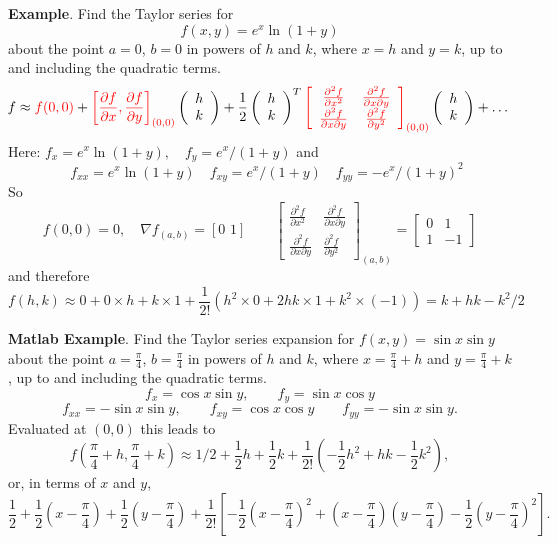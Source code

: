 \documentclass{article}
\begin{document}
\textbf{Example}.  Find the Taylor series  for
$$
f(x,y) = e^x \ln(1+y)
$$
about the point $a=0$, $b=0$ in powers of $h$ and $k$, where $x=h$ and $y=k$, up to and including the
quadratic terms.
{\small
$$
\hspace{-.1cm}
f\approx \textcolor{red}{f(0,0)} + \textcolor{red}{\left[ \frac{\partial f}{\partial x}, 
\frac{\partial f}{\partial y} \right]_{(0,0)}} \left( \begin{array}{c} h\\k \end{array} \right) + \frac{1}{2} \left( \begin{array}{c} h\\k \end{array} \right)^T \textcolor{red}{\left[ \begin{array}{cc}
\frac{\partial ^2 f}{\partial x ^2} & \frac{\partial ^2 f}{\partial x \partial y}\\\frac{\partial ^2 f}{\partial x \partial y} & \frac{\partial ^2 f}{\partial y ^2} \end{array} \right]_{(0,0)} }\left( \begin{array}{c} h\\k \end{array} \right) + \ldots 
$$
}
Here: $f_x = e^x \ln(1+y), \quad f_y = e^x/(1+y)$ and
$$
\quad f_{xx} = e^x \ln(1+y) \quad f_{xy}=e^x/(1+y) \quad f_{yy} = {-e^x/(1+y)^2}
$$
So
{\small
$$
f(0,0) = 0, \quad \nabla f_{(a,b)} =[0\,\,1] \qquad \left[ \begin{array}{cc}
\frac{\partial ^2 f}{\partial x ^2} & \frac{\partial ^2 f}{\partial x \partial y}\\\frac{\partial ^2 f}{\partial x \partial y} & \frac{\partial ^2 f}{\partial y ^2} \end{array} \right]_{(a,b)} =
\left[ \begin{array}{cc}
0 & 1\\1 & -1 \end{array} \right]
$$
}
and therefore
{\small
$$
f(h,k) \approx 0+ 0 \times h + k \times 1 + \frac{1}{2!} \left( h^2 \times 0 + 2hk \times 1  + k^2 \times (-1)\right)  = k+ hk-k^2/2
$$
}


\textbf{Matlab Example}.  Find the Taylor series expansion for
$f(x,y) = \sin x \sin y $ about the point $a=\frac{\pi}{4}$, $b=\frac{\pi}{4}$
in powers of $h$ and $k$, where $x=\frac{\pi}{4}+h$ and $y=\frac{\pi}{4}+k$, up to
and including the quadratic terms.
{\small 
$$
f_x = \cos x \sin y, \qquad f_y = \sin x \cos y
$$
}
{\small
$$
f_{xx} =-\sin x \sin y,\qquad f_{xy} = \cos x \cos y\qquad
f_{yy}=-\sin x \sin y.
$$
}
Evaluated at $(0,0)$ this leads to
$$
f(\frac{\pi}{4}+h,\frac{\pi}{4}+k)\approx 1/2 + \frac{1}{2} h +
\frac{1}{2}k + \frac{1}{2!} \left( -\frac{1}{2} h^2  + hk  -
\frac{1}{2} k^2 \right),
$$
or, in terms of $x$ and $y$,
{\small
$$
\frac{1}{2} + \frac{1}{2} (x-\frac{\pi}{4}) +
\frac{1}{2}(y-\frac{\pi}{4}) + \frac{1}{2!} \left[ -\frac{1}{2} (x-\frac{\pi}{4})^2  + (x-\frac{\pi}{4})(y-\frac{\pi}{4})  -
\frac{1}{2} (y-\frac{\pi}{4})^2 \right].
$$
}
\end{document}
